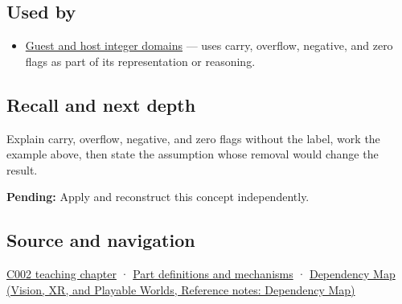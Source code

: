 \subsection{Used by}\label{appendix-8d687c9c08ab-used-by}

\hypertarget{appendix-8d687c9c08ab-used-by}{}

\begin{itemize}
\tightlist
\item
  \hyperref[appendix-33e7a011b684]{Guest and host integer domains} --- uses carry, overflow, negative, and zero flags as part of its representation or reasoning.
\end{itemize}

\subsection{Recall and next depth}\label{appendix-8d687c9c08ab-recall-and-next-depth}

\hypertarget{appendix-8d687c9c08ab-recall-and-next-depth}{}

Explain carry, overflow, negative, and zero flags without the label, work the example above, then state the assumption whose removal would change the result.

\textbf{Pending:} Apply and reconstruct this concept independently.

\subsection{Source and navigation}\label{appendix-8d687c9c08ab-source-and-navigation}

\hypertarget{appendix-8d687c9c08ab-source-and-navigation}{}

\hyperref[01-foundations-i-ch001-arithmetic-becomes-a-policy]{C002 teaching chapter} · \hyperref[appendix-fd090d982a15]{Part definitions and mechanisms} · \href{../07-Vision-XR-and-Playable-Worlds/main.pdf\#nameddest=appendix-4ad47bdd269a}{Dependency Map (Vision, XR, and Playable Worlds, Reference notes: Dependency Map)}
